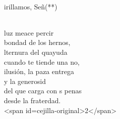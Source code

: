 \documentclass[12pt]{article}
\begin{document}
\begin{multicols*}{2}
\begin{cancion}
\begin{chorus}
{}\vspace*{-0.4cm}\\
	irillamos, Señ(**) \\
	\end{chorus}%
	\jump\\
	 luz meace percir\\
	 bondad de los hernos,\\
	lternura del quayuda\\
	cuando te tiende una no,\\
	 ilusión, la paza entrega\\
	y la generosid\\
	del que carga con s penas\\
	desde la fraterdad. \\
<span id=cejilla-original>2</span>\\
\end{cancion}%


\end{multicols*}
\end{document}
